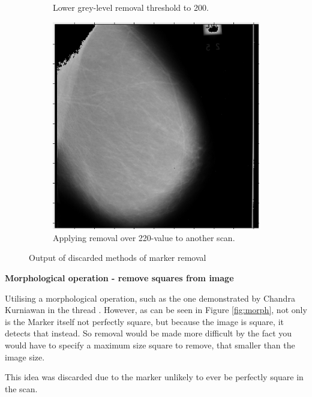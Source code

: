 \begin{figure}[H]
\begin{subfigure}[t]{0.3\textwidth}
      \caption{Lower grey-level removal threshold to 200.}
      \label{fig:remove-white-200}
    \end{subfigure} \hfill
    \begin{subfigure}[t]{0.3\textwidth}
      \includegraphics[width=\textwidth]{Chapter2/technical-img/other-scan.png}
      \caption{Applying removal over 220-value to another scan.}
      \label{fig:remove-other-scan}
    \end{subfigure}
    \caption{Output of discarded methods of marker removal}
    \label{fig:marker-removal-discards}
\end{figure}

\textbf{Morphological operation - remove squares from image}

Utilising a morphological operation, such as the one demonstrated by Chandra Kurniawan in the thread \cite{detect_square}. However, as can be seen in Figure \ref{fig:morph}, not only is the Marker itself not perfectly square, but because the image is square, it detects that instead. So removal would be made more difficult by the fact you would have to specify a maximum size square to remove, that smaller than the image size.

This idea was discarded due to the marker unlikely to ever be perfectly square in the scan.

